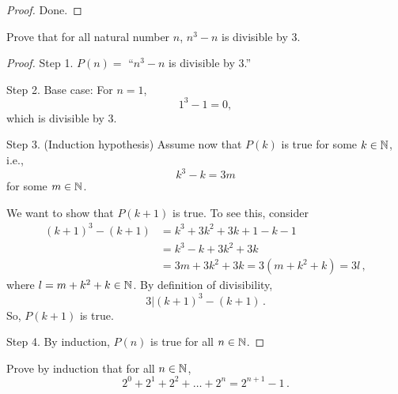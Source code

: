 \documentclass[12pt]{amsart}
\begin{document}
\begin{proof}
    Done.
\end{proof}

\begin{problem}
    Prove that
    for all natural number $n$,
    $n^3 - n$ is divisible by 3.
\end{problem}

\begin{proof}
    Step 1. $P(n) =$ ``$n^3 - n$ is divisible by 3.''
   
    Step 2. Base case: For $n=1$,
    \begin{equation*}
        1^3 - 1 = 0, 
    \end{equation*}
    which is divisible by 3.

    Step 3. (Induction hypothesis) Assume now that $P(k)$ is true for some $k\in \mathbb{N}$, i.e.,
    \begin{equation*}
        k^3 - k = 3 m
    \end{equation*}
    for some $m\in \mathbb{N}$.

    We want to show that $P(k+1)$ is true. To see this, consider
    \begin{align*}
        (k+1)^3 - (k+1) &= k^3 + 3k^2 + 3k + 1 - k - 1 \\
                        &= k^3 - k + 3k^2 + 3k\\
                        &= 3m + 3k^2 + 3k = 3( m + k^2 + k) = 3 l \,,
    \end{align*}
    where $l = m + k^2 + k \in \mathbb{N}$. By definition of divisibility,
    \begin{equation*}
        3 | (k+1)^3 - (k+1) \,.
    \end{equation*}
    So, $P(k+1)$ is true.

    Step 4. By induction, $P(n)$ is true for all $n\in \mathbb{N}$.
\end{proof}

\begin{problem}
    Prove by induction that
    for all $n \in \mathbb{N}$,
    \begin{equation*}
        2^0 + 2^1 + 2^2 + \dots+ 2^n = 2^{n+1}-1 \,.
    \end{equation*}
\end{problem}
\end{document}
